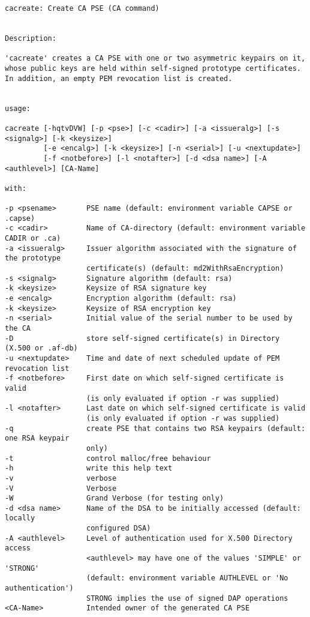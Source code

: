 {\begin{verbatim}
cacreate: Create CA PSE (CA command)


Description:

'cacreate' creates a CA PSE with one or two asymmetric keypairs on it,
whose public keys are held within self-signed prototype certificates.
In addition, an empty PEM revocation list is created.


usage:

cacreate [-hqtvDVW] [-p <pse>] [-c <cadir>] [-a <issueralg>] [-s <signalg>] [-k <keysize>]
         [-e <encalg>] [-k <keysize>] [-n <serial>] [-u <nextupdate>]
         [-f <notbefore>] [-l <notafter>] [-d <dsa name>] [-A <authlevel>] [CA-Name]

with:

-p <psename>       PSE name (default: environment variable CAPSE or .capse)
-c <cadir>         Name of CA-directory (default: environment variable CADIR or .ca)
-a <issueralg>     Issuer algorithm associated with the signature of the prototype 
                   certificate(s) (default: md2WithRsaEncryption)
-s <signalg>       Signature algorithm (default: rsa)
-k <keysize>       Keysize of RSA signature key
-e <encalg>        Encryption algorithm (default: rsa)
-k <keysize>       Keysize of RSA encryption key
-n <serial>        Initial value of the serial number to be used by the CA
-D                 store self-signed certificate(s) in Directory (X.500 or .af-db)
-u <nextupdate>    Time and date of next scheduled update of PEM revocation list
-f <notbefore>     First date on which self-signed certificate is valid
                   (is only evaluated if option -r was supplied)
-l <notafter>      Last date on which self-signed certificate is valid
                   (is only evaluated if option -r was supplied)
-q                 create PSE that contains two RSA keypairs (default: one RSA keypair 
                   only)
-t                 control malloc/free behaviour
-h                 write this help text
-v                 verbose
-V                 Verbose
-W                 Grand Verbose (for testing only)
-d <dsa name>      Name of the DSA to be initially accessed (default: locally 
                   configured DSA)
-A <authlevel>     Level of authentication used for X.500 Directory access
                   <authlevel> may have one of the values 'SIMPLE' or 'STRONG'
                   (default: environment variable AUTHLEVEL or 'No authentication')
                   STRONG implies the use of signed DAP operations
<CA-Name>          Intended owner of the generated CA PSE


\end{verbatim}}
